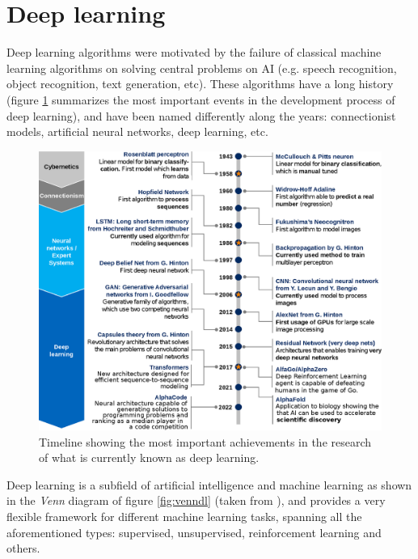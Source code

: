 \section{Deep learning}

Deep learning algorithms were motivated by the failure of classical machine learning algorithms on solving central problems on AI (e.g. speech recognition, object recognition, text generation, etc). These algorithms have a long history (figure \ref{fig:dl-timeline} summarizes the most important events in the development process of deep learning), and have been named differently along the years: connectionist models, artificial neural networks, deep learning, etc.

\begin{figure}
	\centering
	\includegraphics[width=1.0\linewidth]{background/images/DL-timeline}
	\caption[Deep learning history timeline]{Timeline showing the most important achievements in the research of what is currently known as deep learning.}
	\label{fig:dl-timeline}
\end{figure}


Deep learning is a subfield of artificial intelligence and machine learning as shown in the \textit{Venn} diagram of figure \ref{fig:venndl} (taken from \cite{Goodfellow2016}), and provides a very flexible framework for different machine learning tasks, spanning all the aforementioned types: supervised, unsupervised, reinforcement learning and others.

